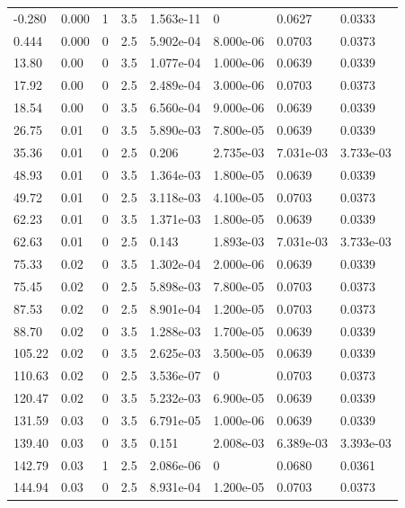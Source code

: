 \documentclass[preview]{standalone}
\begin{document}
{{\begin{tabular}{L{1.2cm}C{1.2cm} C{0.3cm}C{0.5cm} C{1.4cm}C{1.4cm} C{1.4cm}C{1.4cm}}
  -0.280  &  0.000  & 1     & 3.5 &  1.563e-11  & 0  & 0.0627 &  0.0333   \\ 
  0.444  &  0.000  & 0     & 2.5 &  5.902e-04  & 8.000e-06  & 0.0703 &  0.0373   \\ 
  13.80  &  0.00  & 0     & 3.5 &  1.077e-04  & 1.000e-06  & 0.0639 &  0.0339   \\ 
  17.92  &  0.00  & 0     & 2.5 &  2.489e-04  & 3.000e-06  & 0.0703 &  0.0373   \\ 
  18.54  &  0.00  & 0     & 3.5 &  6.560e-04  & 9.000e-06  & 0.0639 &  0.0339   \\ 
  26.75  &  0.01  & 0     & 3.5 &  5.890e-03  & 7.800e-05  & 0.0639 &  0.0339   \\ 
  35.36  &  0.01  & 0     & 2.5 &  0.206  & 2.735e-03  & 7.031e-03 &  3.733e-03   \\ 
  48.93  &  0.01  & 0     & 3.5 &  1.364e-03  & 1.800e-05  & 0.0639 &  0.0339   \\ 
  49.72  &  0.01  & 0     & 2.5 &  3.118e-03  & 4.100e-05  & 0.0703 &  0.0373   \\ 
  62.23  &  0.01  & 0     & 3.5 &  1.371e-03  & 1.800e-05  & 0.0639 &  0.0339   \\ 
  62.63  &  0.01  & 0     & 2.5 &  0.143  & 1.893e-03  & 7.031e-03 &  3.733e-03   \\ 
  75.33  &  0.02  & 0     & 3.5 &  1.302e-04  & 2.000e-06  & 0.0639 &  0.0339   \\ 
  75.45  &  0.02  & 0     & 2.5 &  5.898e-03  & 7.800e-05  & 0.0703 &  0.0373   \\ 
  87.53  &  0.02  & 0     & 2.5 &  8.901e-04  & 1.200e-05  & 0.0703 &  0.0373   \\ 
  88.70  &  0.02  & 0     & 3.5 &  1.288e-03  & 1.700e-05  & 0.0639 &  0.0339   \\ 
  105.22  &  0.02  & 0     & 3.5 &  2.625e-03  & 3.500e-05  & 0.0639 &  0.0339   \\ 
  110.63  &  0.02  & 0     & 2.5 &  3.536e-07  & 0  & 0.0703 &  0.0373   \\ 
  120.47  &  0.02  & 0     & 3.5 &  5.232e-03  & 6.900e-05  & 0.0639 &  0.0339   \\ 
  131.59  &  0.03  & 0     & 3.5 &  6.791e-05  & 1.000e-06  & 0.0639 &  0.0339   \\ 
  139.40  &  0.03  & 0     & 3.5 &  0.151  & 2.008e-03  & 6.389e-03 &  3.393e-03   \\ 
  142.79  &  0.03  & 1     & 2.5 &  2.086e-06  & 0  & 0.0680 &  0.0361   \\ 
  144.94  &  0.03  & 0     & 2.5 &  8.931e-04  & 1.200e-05  & 0.0703 &  0.0373   \\ 

\end{tabular}}}
\end{document}
